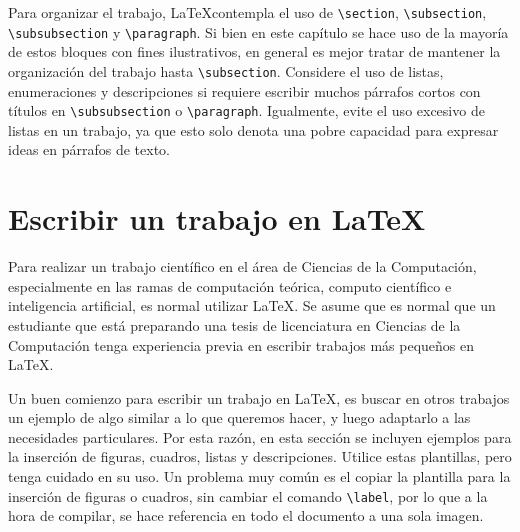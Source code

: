  Para organizar el trabajo, \LaTeX contempla el uso de
 \verb+\section+, \verb+\subsection+, \verb+\subsubsection+ y
 \verb+\paragraph+. Si bien en este capítulo se hace uso de la mayoría
 de estos bloques con fines ilustrativos, en general es mejor tratar
 de mantener la organización del trabajo hasta
 \verb+\subsection+. Considere el uso de listas, enumeraciones y
 descripciones si requiere escribir muchos párrafos cortos con títulos
 en \verb+\subsubsection+ o \verb+\paragraph+. Igualmente, evite el
 uso excesivo de listas en un trabajo, ya que esto solo denota una
 pobre capacidad para expresar ideas en párrafos de texto.


 \section{Escribir un trabajo en \LaTeX}


Para realizar un trabajo científico en el área de Ciencias de la
Computación, especialmente en las ramas de computación teórica,
computo científico e inteligencia artificial, es normal utilizar
\LaTeX. Se asume que es normal que un estudiante que está preparando
una tesis de licenciatura en Ciencias de la Computación tenga
experiencia previa en escribir trabajos más pequeños en \LaTeX. 

Un buen comienzo para escribir un trabajo en \LaTeX, es buscar en otros trabajos un
ejemplo de algo similar a lo que queremos hacer, y luego adaptarlo a
las necesidades particulares. Por esta razón, en esta sección se
incluyen ejemplos para la inserción de figuras, cuadros, listas y
descripciones. Utilice estas plantillas, pero tenga cuidado en su
uso. Un problema muy común es el copiar la plantilla para la inserción
de figuras o cuadros, sin cambiar el comando \verb+\label+, por lo que
a la hora de compilar, se hace referencia en todo el documento a una
sola imagen.


